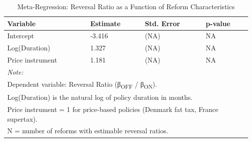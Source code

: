 \begin{table}[!h]
\centering
\caption{Meta-Regression: Reversal Ratio as a Function of Reform Characteristics}
\centering
\begin{tabular}[t]{llll}
\toprule
Variable & Estimate & Std. Error & p-value\\
\midrule
Intercept & -3.416 & (NA) & NA\\
Log(Duration) & 1.327 & (NA) & NA\\
Price instrument & 1.181 & (NA) & NA\\
\bottomrule
\multicolumn{4}{l}{\rule{0pt}{1em}\textit{Note: }}\\
\multicolumn{4}{l}{\rule{0pt}{1em}Dependent variable: Reversal Ratio (β\textsubscript{OFF} / β\textsubscript{ON}).}\\
\multicolumn{4}{l}{\rule{0pt}{1em}Log(Duration) is the natural log of policy duration in months.}\\
\multicolumn{4}{l}{\rule{0pt}{1em}Price instrument = 1 for price-based policies (Denmark fat tax, France supertax).}\\
\multicolumn{4}{l}{\rule{0pt}{1em}N = number of reforms with estimable reversal ratios.}\\
\end{tabular}
\end{table}
